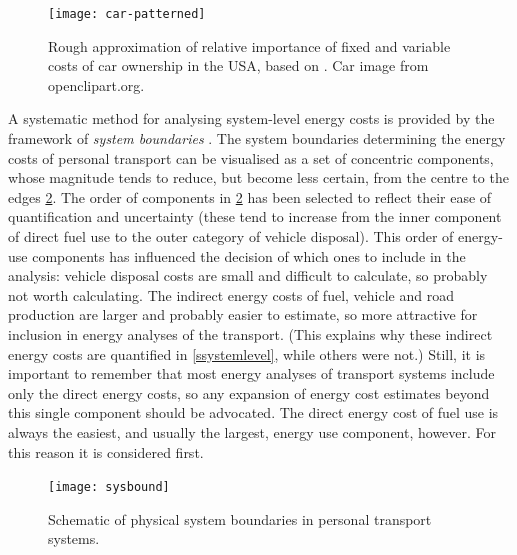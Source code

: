 \begin{figure}[h]
 \begin{center}
 \texttt{[image: car-patterned]}\end{center}
 \caption[Relative importance of fixed and variable costs
of car ownership]{Rough approximation of relative importance of fixed and
variable costs of car ownership in the USA, based on
 \citet[p.~114]{Smil1993}. Car image from openclipart.org.}
 \label{fcar-patterned}
\end{figure}

A systematic method for analysing system-level energy costs is
provided by the framework of \emph{system boundaries}
\citep{Ekvall2004-lifecycle}. 
The system boundaries determining the energy costs
of personal transport can be visualised as a set of concentric components,
whose magnitude tends to reduce, but become less certain, from the centre to
the edges \cref{f:sysbound}. The order of components in \cref{f:sysbound} has
been selected to reflect their ease of quantification and uncertainty (these
tend to increase from the inner component of direct fuel use to the outer
category of vehicle disposal). This order of energy-use components has
influenced the decision of which ones to include in the analysis: vehicle
disposal costs are small and difficult to calculate, so probably not worth
calculating. The indirect energy costs of fuel, vehicle and road production are
larger and probably easier to estimate, so more attractive for inclusion in
energy analyses of the transport. (This explains why these indirect energy
costs are quantified in \cref{ssystemlevel}, while others were not.) Still, it
is important to remember that most energy analyses of transport
systems include only the direct energy costs, so any expansion of energy cost
estimates beyond this single component should be advocated.
The direct energy cost of fuel use is always the easiest, and usually the
largest, energy use component, however. For this reason it is considered first.

\begin{figure}[h]
 \begin{center}
 \texttt{[image: sysbound]}\end{center}
 \caption{Schematic of physical system boundaries in personal
 transport systems.}
 \label{f:sysbound}
\end{figure}

